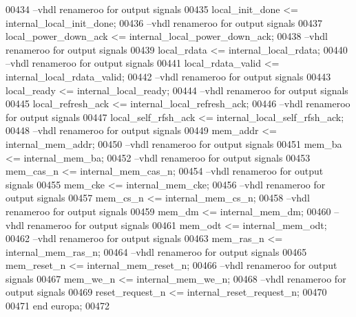 \begin{DoxyCode}
00434 \textcolor{keyword}{  --vhdl renameroo for output signals}
00435   local\_init\_done <= internal\_local\_init\_done;
00436 \textcolor{keyword}{  --vhdl renameroo for output signals}
00437   local\_power\_down\_ack <= internal\_local\_power\_down\_ack;
00438 \textcolor{keyword}{  --vhdl renameroo for output signals}
00439   local\_rdata <= internal\_local\_rdata;
00440 \textcolor{keyword}{  --vhdl renameroo for output signals}
00441   local\_rdata\_valid <= internal\_local\_rdata\_valid;
00442 \textcolor{keyword}{  --vhdl renameroo for output signals}
00443   local\_ready <= internal\_local\_ready;
00444 \textcolor{keyword}{  --vhdl renameroo for output signals}
00445   local\_refresh\_ack <= internal\_local\_refresh\_ack;
00446 \textcolor{keyword}{  --vhdl renameroo for output signals}
00447   local\_self\_rfsh\_ack <= internal\_local\_self\_rfsh\_ack;
00448 \textcolor{keyword}{  --vhdl renameroo for output signals}
00449   \textcolor{vhdlchar}{mem_addr} \textcolor{vhdlchar}{<=} \textcolor{vhdlchar}{internal_mem_addr};
00450 \textcolor{keyword}{  --vhdl renameroo for output signals}
00451   \textcolor{vhdlchar}{mem_ba} \textcolor{vhdlchar}{<=} \textcolor{vhdlchar}{internal_mem_ba};
00452 \textcolor{keyword}{  --vhdl renameroo for output signals}
00453   \textcolor{vhdlchar}{mem_cas_n} \textcolor{vhdlchar}{<=} \textcolor{vhdlchar}{internal_mem_cas_n};
00454 \textcolor{keyword}{  --vhdl renameroo for output signals}
00455   \textcolor{vhdlchar}{mem_cke} \textcolor{vhdlchar}{<=} \textcolor{vhdlchar}{internal_mem_cke};
00456 \textcolor{keyword}{  --vhdl renameroo for output signals}
00457   \textcolor{vhdlchar}{mem_cs_n} \textcolor{vhdlchar}{<=} \textcolor{vhdlchar}{internal_mem_cs_n};
00458 \textcolor{keyword}{  --vhdl renameroo for output signals}
00459   \textcolor{vhdlchar}{mem_dm} \textcolor{vhdlchar}{<=} \textcolor{vhdlchar}{internal_mem_dm};
00460 \textcolor{keyword}{  --vhdl renameroo for output signals}
00461   \textcolor{vhdlchar}{mem_odt} \textcolor{vhdlchar}{<=} \textcolor{vhdlchar}{internal_mem_odt};
00462 \textcolor{keyword}{  --vhdl renameroo for output signals}
00463   \textcolor{vhdlchar}{mem_ras_n} \textcolor{vhdlchar}{<=} \textcolor{vhdlchar}{internal_mem_ras_n};
00464 \textcolor{keyword}{  --vhdl renameroo for output signals}
00465   \textcolor{vhdlchar}{mem_reset_n} \textcolor{vhdlchar}{<=} \textcolor{vhdlchar}{internal_mem_reset_n};
00466 \textcolor{keyword}{  --vhdl renameroo for output signals}
00467   \textcolor{vhdlchar}{mem_we_n} \textcolor{vhdlchar}{<=} \textcolor{vhdlchar}{internal_mem_we_n};
00468 \textcolor{keyword}{  --vhdl renameroo for output signals}
00469   \textcolor{vhdlchar}{reset_request_n} \textcolor{vhdlchar}{<=} \textcolor{vhdlchar}{internal_reset_request_n};
00470 
00471 \textcolor{keywordflow}{end} \textcolor{vhdlchar}{europa};
00472 
\end{DoxyCode}
